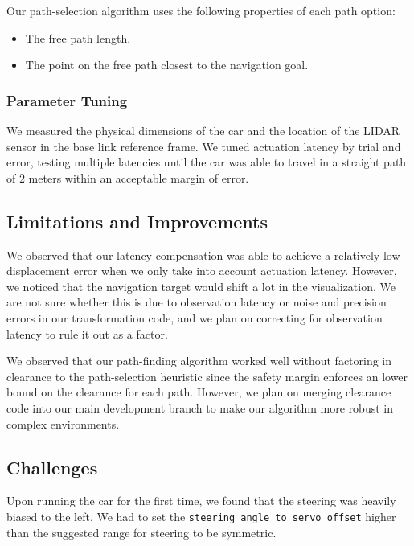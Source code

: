 \documentclass[11pt]{article}
\begin{document}
Our path-selection algorithm uses the following properties of each path option:
\begin{itemize}
    \item The free path length.
    \item The point on the free path closest to the navigation goal.
\end{itemize}

\subsubsection{Parameter Tuning}

We measured the physical dimensions of the car and the location of the LIDAR
sensor in the base link reference frame. We tuned actuation latency by trial and
error, testing multiple latencies until the car was able to travel in a straight
path of 2 meters within an acceptable margin of error.

\subsection{Limitations and Improvements}

We observed that our latency compensation was able to achieve a relatively low
displacement error when we only take into account actuation latency. However, we
noticed that the navigation target would shift a lot in the visualization. We
are not sure whether this is due to observation latency or noise and precision
errors in our transformation code, and we plan on correcting for observation
latency to rule it out as a factor.

\bigskip
\noindent
We observed that our path-finding algorithm worked well without factoring in
clearance to the path-selection heuristic since the safety margin enforces an
lower bound on the clearance for each path. However, we plan on merging
clearance code into our main development branch to make our algorithm more
robust in complex environments.


\subsection{Challenges}

Upon running the car for the first time, we found that the steering was heavily
biased to the left. We had to set the
\texttt{steering\_angle\_to\_servo\_offset} higher than the suggested range for
steering to be symmetric.
\end{document}
